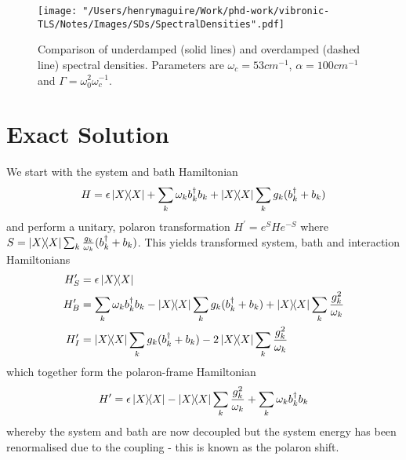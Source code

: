 \documentclass[]{article}
\begin{document}
\begin{figure}
	\texttt{[image: "/Users/henrymaguire/Work/phd-work/vibronic-TLS/Notes/Images/SDs/SpectralDensities".pdf]}
	\caption{Comparison of underdamped (solid lines) and overdamped (dashed line) spectral densities. Parameters are $\omega_c=53cm^{-1}$, $\alpha=100cm^{-1}$ and $\Gamma=\omega_0^2\omega_c^{-1}$.}
\end{figure}
\section{Exact Solution}
We start with the system and bath Hamiltonian
\begin{equation}
H = \epsilon\dyad{X} + \sum_{k}\omega_k b_k^{\dagger} b_k + \dyad{X}\sum_{k}g_k (b_k^{\dagger}+b_k)
\end{equation}
and perform a unitary, polaron transformation $H^{\prime} = e^{S}He^{-S}$ where $S= \dyad{X}\sum_{k}\frac{g_k}{\omega_k}(b_k^{\dagger}+b_k)$. This yields transformed system, bath and interaction Hamiltonians
\begin{align}
H_S^{\prime} &= \epsilon\dyad{X} \\
H_B^{\prime} &= \sum_{k}\omega_k b_k^{\dagger}b_k - \dyad{X}\sum_{k}g_k (b_k^{\dagger}+b_k) +\dyad{X}\sum_{k}\frac{g^2_k}{\omega_k} \\
H_I^{\prime} &= \dyad{X}\sum_{k}g_k (b_k^{\dagger}+b_k) - 2\dyad{X}\sum_{k}\frac{g^2_k}{\omega_k} \\
\end{align}
which together form the polaron-frame Hamiltonian
\begin{equation}
H^{\prime} = \epsilon\dyad{X} - \dyad{X}\sum_{k}\frac{g^2_k}{\omega_k} + \sum_{k}\omega_k b_k^{\dagger}b_k
\end{equation}
whereby the system and bath are now decoupled but the system energy has been renormalised due to the coupling - this is known as the polaron shift.
\end{document}
